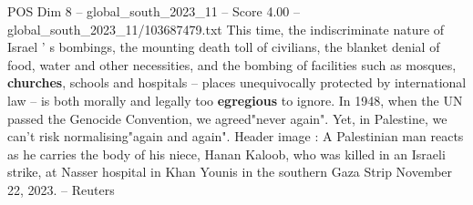\begin{textsample}{POS Dim 8 – global\_south\_2023\_11 – Score 4.00 – global\_south\_2023\_11/103687479.txt}
This time, the indiscriminate nature of Israel ' s bombings, the mounting death toll of civilians, the blanket denial of food, water and other necessities, and the bombing of facilities such as mosques, \textbf{churches}, schools and hospitals -- places unequivocally protected by international law -- is both morally and legally too \textbf{egregious} to ignore.
In 1948, when the UN passed the Genocide Convention, we agreed"never again".
Yet, in Palestine, we can't risk normalising"again and again".
Header image : A Palestinian man reacts as he carries the body of his niece, Hanan Kaloob, who was killed in an Israeli strike, at Nasser hospital in Khan Younis in the southern Gaza Strip November 22, 2023. -- Reuters

\end{textsample}
